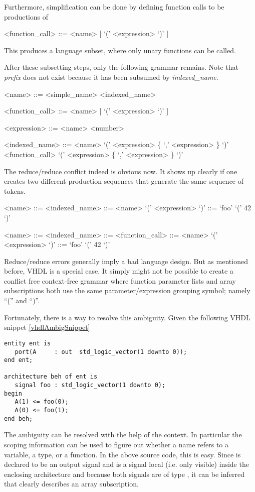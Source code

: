Furthermore, simplification can be done by defining function calls to
be productions of
\begin{grammar}
<function_call> ::=
<name> [ `(' { <expression> } `)' ]
\end{grammar}
%
This produces a language subset, where only unary functions can be
called.

After these subsetting steps, only the following grammar remains.
Note that \emph{prefix} does not exist because it has been subsumed by
\emph{indexed_name}.
\begin{grammar}
<name> ::=
  <simple_name>
\alt <indexed_name>

<function_call> ::=
<name> [ `(' { <expression> } `)' ]

<expression> ::= <name> \alt <number>

<indexed_name> ::= <name> `(' <expression> \{ `,' <expression> \} `)'
\alt <function_call> `(' <expression> \{ `,' <expression> \} `)'
\end{grammar}
%
The reduce/reduce conflict indeed is obvious now.
It shows up clearly if one creates
two different production sequences that generate the same
sequence of tokens.
%
\begin{grammar}
<name> ::= <indexed_name> ::= <name> `(' <expression> `)' ::= `foo'
`(' 42 `)'

<name> ::= <indexed_name> ::= <function_call> ::= <name> `('
<expression> `)' ::= `foo' `(' 42 `)'
\end{grammar}
%
Reduce/reduce errors generally imply a bad language design. But as mentioned
before, VHDL is a special case. It simply might not be possible to create a
conflict free context-free grammar where function parameter lists and
array subscriptions both use the same parameter/expression grouping
symbol; namely ``('' and ``)''.

Fortunately, there is a way to resolve this ambiguity. Given the
following VHDL snippet \ref{vhdlAmbigSnippet}
%
\begin{lstlisting}[style=vhdl, caption={Example of a syntactically
      ambiguous VHDL snippet}, label=vhdlAmbigSnippet]
entity ent is
   port(A     : out  std_logic_vector(1 downto 0));
end ent;

architecture beh of ent is
   signal foo : std_logic_vector(1 downto 0);
begin
   A(1) <= foo(0);
   A(0) <= foo(1);
end beh;
\end{lstlisting}
%
The ambiguity can be resolved with the help of the context. In
particular the scoping information can be used to figure out whether a
name refers to a variable, a type, or a function.
In the above source code, this is easy. Since  is declared to
be an output signal and  is a signal local (i.e. only
visible) inside the enclosing architecture and
because both signals are of type , it can be
inferred that  clearly describes an array subscription.

